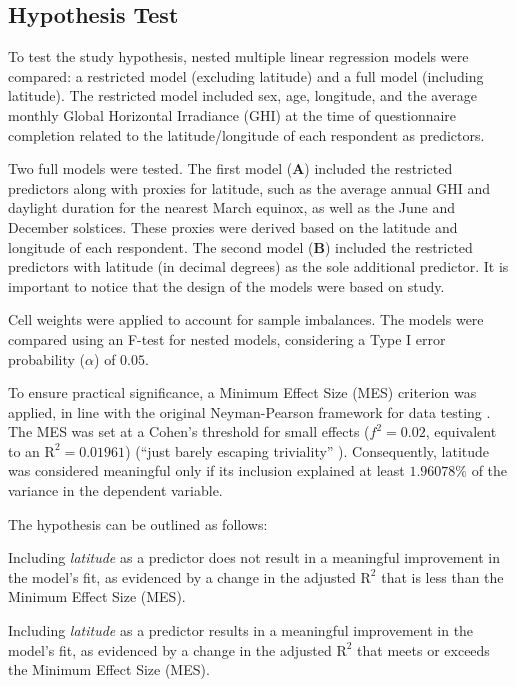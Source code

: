 \documentclass[
12pt,
openright,
oneside,
a4paper,
chapter=TITLE,
section=TITLE,
french,
spanish,
brazil,
english
]{abntex2}
\providecommand{\tightlist}{
\setlength{\itemsep}{0ex}\setlength{\parskip}{0\baselineskip}}
\begin{document}
\subsection{Hypothesis Test}\label{hypothesis-test}

To test the study hypothesis, nested multiple linear regression models
were compared: a restricted model (excluding latitude) and a full model
(including latitude). The restricted model included sex, age, longitude,
and the average monthly Global Horizontal Irradiance (GHI) at the time
of questionnaire completion related to the latitude/longitude of each
respondent as predictors.

Two full models were tested. The first model (\textbf{A}) included the
restricted predictors along with proxies for latitude, such as the
average annual GHI and daylight duration for the nearest March equinox,
as well as the June and December solstices. These proxies were derived
based on the latitude and longitude of each respondent. The second model
(\textbf{B}) included the restricted predictors with latitude (in
decimal degrees) as the sole additional predictor. It is important to
notice that the design of the models were based on
\textcite{leocadio-miguel2017} study.

Cell weights were applied to account for sample imbalances. The models
were compared using an F-test for nested models, considering a Type I
error probability (\(\alpha\)) of \(0.05\).

To ensure practical significance, a Minimum Effect Size (MES) criterion
was applied, in line with the original Neyman-Pearson framework for data
testing \autocite{neyman1928,neyman1928a,perezgonzalez2015}. The MES was
set at a Cohen's threshold for small effects (\(f^2 = 0.02\), equivalent
to an \(\text{R}^2 = 0.01961\)) (``just barely escaping triviality''
\autocite[413]{cohen1988a}). Consequently, latitude was considered
meaningful only if its inclusion explained at least \(1.96078\%\) of the
variance in the dependent variable.

The hypothesis can be outlined as follows:

\begin{description}
\tightlist
\item[\textbf{Null Hypothesis} (\(\text{H}_{0}\))]
Including \emph{latitude} as a predictor does not result in a meaningful
improvement in the model's fit, as evidenced by a change in the adjusted
\(\text{R}^{2}\) that is less than the Minimum Effect Size (MES).
\item[\textbf{Alternative Hypothesis} (\(\text{H}_{a}\))]
Including \emph{latitude} as a predictor results in a meaningful
improvement in the model's fit, as evidenced by a change in the adjusted
\(\text{R}^{2}\) that meets or exceeds the Minimum Effect Size (MES).
\end{description}
\end{document}
